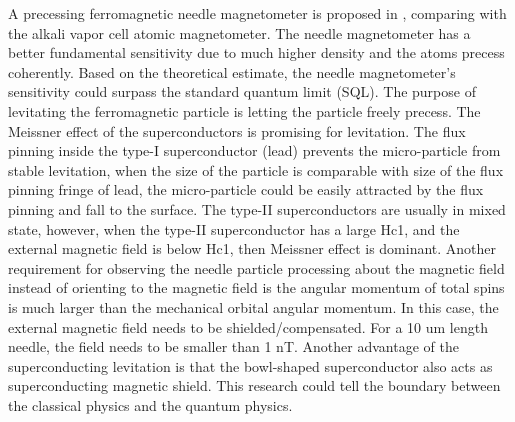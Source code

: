 A precessing ferromagnetic needle magnetometer is proposed in \cite{Jackson_Kimball_2016}, comparing with the alkali vapor cell atomic magnetometer. The needle magnetometer has a better fundamental sensitivity due to much higher density and the atoms precess coherently. Based on the theoretical estimate, the needle magnetometer's sensitivity could surpass the standard quantum limit (SQL). The purpose of levitating the ferromagnetic particle is letting the particle freely precess. The Meissner effect of the superconductors is promising for levitation. The flux pinning inside the type-I superconductor (lead) prevents the micro-particle from stable levitation, when the size of the particle is comparable with size of the flux pinning fringe of lead, the micro-particle could be easily attracted by the flux pinning and fall to the surface. The type-II superconductors are usually in mixed state, however, when the type-II superconductor has a large Hc1, and the external magnetic field is below Hc1, then Meissner effect is dominant. Another requirement for observing the needle particle processing about the magnetic field instead of orienting to the magnetic field is the angular momentum of total spins is much larger than the mechanical orbital angular momentum. In this case, the external magnetic field needs to be shielded/compensated. For a 10 um length needle, the field needs to be smaller than 1 nT. Another advantage of the superconducting levitation is that the bowl-shaped superconductor also acts as superconducting magnetic shield. This research could tell the boundary between the classical physics and the quantum physics.